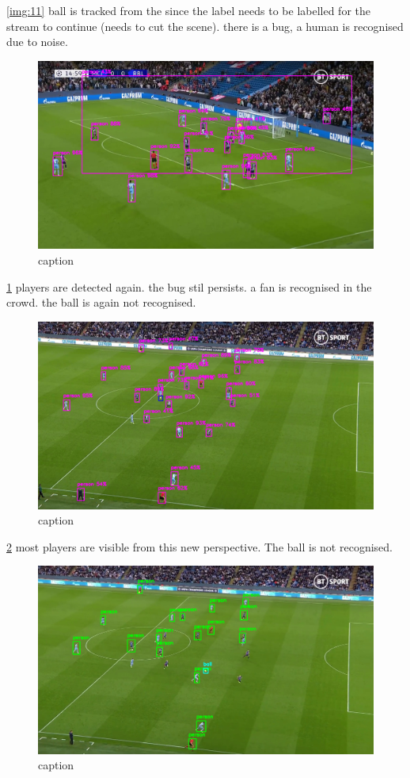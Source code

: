 \documentclass[
11pt,
twoside
]{report}
\begin{document}
\ref{img:11} ball is
tracked from the since the label needs to be labelled for the stream to continue (needs to cut the scene). there is a bug, a human is recognised due to noise.
\begin{figure}[H]
    \includegraphics[keepaspectratio, width=\columnwidth]{Screenshot_2022-03-03_23-08-00.png}
    \caption{caption}
    \label{img:12}
\end{figure}
\ref{img:12} players
are detected again. the bug stil persists. a fan is recognised in the crowd. the ball is again not recognised.
\begin{figure}[H]
    \includegraphics[keepaspectratio, width=\columnwidth]{Screenshot_2022-03-03_23-09-45.png}
    \caption{caption}
    \label{img:13}
\end{figure}
\ref{img:13} most
players are visible from this new perspective. The ball is not recognised.
\begin{figure}[H]
    \includegraphics[keepaspectratio, width=\columnwidth]{Screenshot_2022-03-03_23-10-58.png}
    \caption{caption}
    \label{img:14}
\end{figure}
\end{document}
